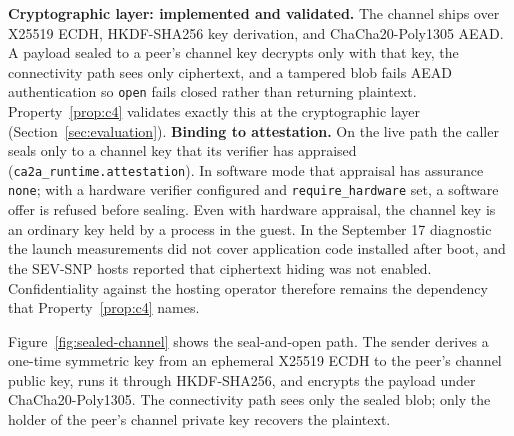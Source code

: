 \textbf{Cryptographic layer: implemented and validated.} The channel ships over
X25519 ECDH, HKDF-SHA256 key derivation, and ChaCha20-Poly1305 AEAD. A payload sealed to a
peer's channel key decrypts only with that key, the connectivity path sees only ciphertext, and
a tampered blob fails AEAD authentication so \texttt{open} fails closed rather than returning
plaintext. Property~\ref{prop:c4} validates exactly this at the cryptographic layer
(Section~\ref{sec:evaluation}).
\textbf{Binding to attestation.} On the live path the caller seals only to a channel key that
its verifier has appraised (\texttt{ca2a\_runtime.attestation}). In software mode that appraisal
has assurance \texttt{none}; with a hardware verifier configured and
\texttt{require\_hardware} set, a software offer is refused before sealing. Even with hardware
appraisal, the channel key is an ordinary key held by a process in the guest. In the
September 17 diagnostic the launch measurements did not cover application code installed after
boot, and the SEV-SNP hosts reported that ciphertext hiding was not enabled. Confidentiality
against the hosting operator therefore remains the dependency that Property~\ref{prop:c4}
names.

Figure~\ref{fig:sealed-channel} shows the seal-and-open path. The sender derives a
one-time symmetric key from an ephemeral X25519 ECDH to the peer's channel public key,
runs it through HKDF-SHA256, and encrypts the payload under ChaCha20-Poly1305. The
connectivity path sees only the sealed blob; only the holder of the peer's channel private key
recovers the plaintext.

